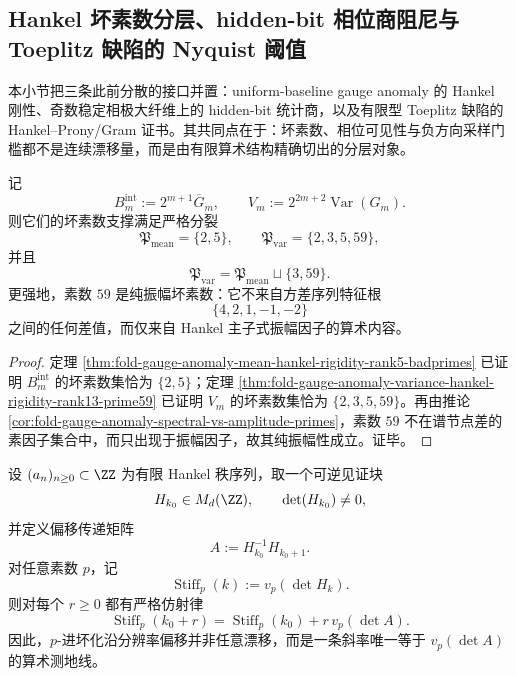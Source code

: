 \subsection{Hankel 坏素数分层、hidden-bit 相位商阻尼与 Toeplitz 缺陷的 Nyquist 阈值}\label{subsec:conclusion-hankel-hiddenbit-toeplitz-alias-badprime-splitting}
本小节把三条此前分散的接口并置：uniform-baseline gauge anomaly 的 Hankel 刚性、奇数稳定相极大纤维上的 hidden-bit 统计商，以及有限型 Toeplitz 缺陷的 Hankel--Prony/Gram 证书。其共同点在于：坏素数、相位可见性与负方向采样门槛都不是连续漂移量，而是由有限算术结构精确切出的分层对象。

\begin{theorem}\label{thm:conclusion-secondorder-hankel-badprime-amplitude-splitting}
记
\[
B_m^{\mathrm{int}}:=2^{m+1}\overline G_m,
\qquad
V_m:=2^{2m+2}\operatorname{Var}(G_m).
\]
则它们的坏素数支撑满足严格分裂
\[
\mathfrak P_{\mathrm{mean}}=\{2,5\},
\qquad
\mathfrak P_{\mathrm{var}}=\{2,3,5,59\},
\]
并且
\[
\mathfrak P_{\mathrm{var}}
=
\mathfrak P_{\mathrm{mean}}
\sqcup
\{3,59\}.
\]
更强地，素数 \(59\) 是纯振幅坏素数：它不来自方差序列特征根
\[
\{4,2,1,-1,-2\}
\]
之间的任何差值，而仅来自 Hankel 主子式振幅因子的算术内容。
\end{theorem}

\begin{proof}
定理 \ref{thm:fold-gauge-anomaly-mean-hankel-rigidity-rank5-badprimes} 已证明 \(B_m^{\mathrm{int}}\) 的坏素数集恰为 \(\{2,5\}\)；定理 \ref{thm:fold-gauge-anomaly-variance-hankel-rigidity-rank13-prime59} 已证明 \(V_m\) 的坏素数集恰为 \(\{2,3,5,59\}\)。再由推论 \ref{cor:fold-gauge-anomaly-spectral-vs-amplitude-primes}，素数 \(59\) 不在谱节点差的素因子集合中，而只出现于振幅因子，故其纯振幅性成立。证毕。
\end{proof}

\begin{theorem}\label{thm:conclusion-padic-hankel-stiffness-affine-transport}
设 \((a_n)_{n\ge 0}\subset \ZZ\) 为有限 Hankel 秩序列，取一个可逆见证块
\[
H_{k_0}\in M_d(\ZZ),
\qquad
\det(H_{k_0})\neq 0,
\]
并定义偏移传递矩阵
\[
A:=H_{k_0}^{-1}H_{k_0+1}.
\]
对任意素数 \(p\)，记
\[
\operatorname{Stiff}_p(k):=v_p(\det H_k).
\]
则对每个 \(r\ge 0\) 都有严格仿射律
\[
\operatorname{Stiff}_p(k_0+r)
=
\operatorname{Stiff}_p(k_0)+r\,v_p(\det A).
\]
因此，\(p\)-进坏化沿分辨率偏移并非任意漂移，而是一条斜率唯一等于 \(v_p(\det A)\) 的算术测地线。
\end{theorem}

